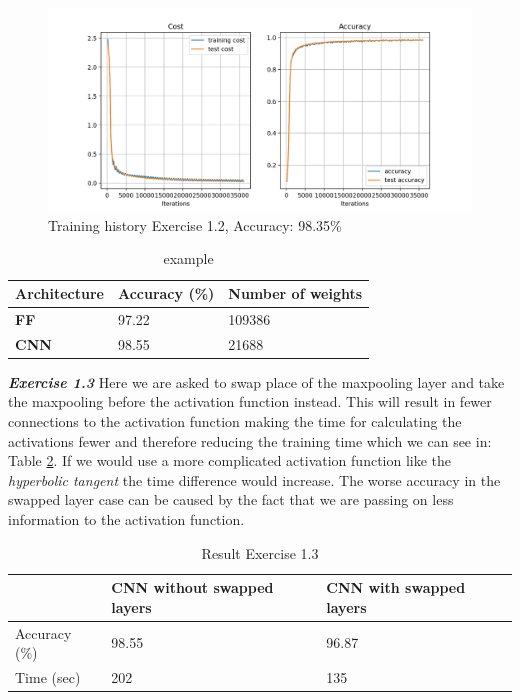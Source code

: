 \documentclass[a4paper,10pt]{article}
\begin{document}
\begin{figure}[ht!]
\centering
\includegraphics[width=120mm]{figures/assignment_3/convnet.png}
\caption{Training history Exercise 1.2, Accuracy: 98.35\%}
\label{fig:convnet1}
\end{figure}

\begin{table}[ht!]
\centering
\begin{tabular}{lll}\hline
 \textbf{Architecture}&  Accuracy (\%)& Number of weights  \\ \hline
 \textbf{FF}&  97.22&  109386\\ 
 \textbf{CNN}& 98.55& 21688 \\\hline
\end{tabular}
\caption{example}
\label{tab:tab4}
\end{table}

\newpage

\textit{\textbf{Exercise 1.3}} Here we are asked to swap place of the maxpooling layer and take the maxpooling before the activation function instead. This will result in fewer connections to the activation function making the time for calculating the activations fewer and therefore reducing the training time which we can see in: Table \ref{tab:tab5}. If we would use a more complicated activation function like the \emph{hyperbolic tangent} the time difference would increase. The worse accuracy in the swapped layer case can be caused by the fact that we are passing on less information to the activation function. 



\begin{table}[ht!]
\centering
\begin{tabular}{lll}\hline
 &  \textbf{CNN without swapped layers}& \textbf{CNN with swapped layers} \\ \hline
 Accuracy (\%) &98.55  &96.87  \\
 Time (sec)&  202& 135\\ \hline
\end{tabular}
\caption{Result Exercise 1.3}
\label{tab:tab5}
\end{table}
\end{document}
